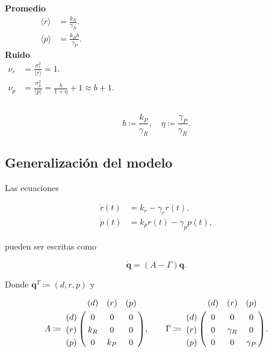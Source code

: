 \documentclass[xcolor=dvipsnames]{beamer}
\begin{document}
\begin{frame}

\begin{columns}[c]
\centering \textbf{Promedio}
\begin{align*}
\langle r \rangle &= \frac{k_R}{\gamma_R}.\\[1.5ex]
\langle p \rangle &= \frac{k_Rb}{\gamma_P}.
\end{align*}
\centering \textbf{Ruido}
\begin{align*}
\nu_r &= \frac{\sigma_r^2}{\langle r \rangle} = 1.\\[1.5ex]
\nu_p &= \frac{\sigma_p^2}{\langle p \rangle} = \frac{b}{1+\eta} + 1 \approx b + 1.
\end{align*}
\end{columns}

\vspace{3 mm}

\begin{equation*}
b \coloneqq \frac{k_P}{\gamma_R}, \quad \eta \coloneqq \frac{\gamma_P}{\gamma_R}.
\end{equation*}

\end{frame}

\subsection{Generalizaci\'on del modelo}
\begin{frame}

Las ecuaciones

\begin{align*}
\dot{r}(t) &= k_r - \gamma_rr(t),\\
\dot{p}(t) &= k_pr(t) - \gamma_pp(t),
\end{align*}

pueden ser escritas como

\begin{equation*}
\mathbf{\dot{q}} = (A - \Gamma)\mathbf{q}.
\end{equation*}

Donde $\mathbf{q}^T \coloneqq (d, r, p)$ y

\begin{align*}
A \coloneqq \bordermatrix{
  ~ & (d) & (r) & (p) \cr
  (d) & 0 & 0 & 0 \cr
  (r) & k_R & 0 & 0 \cr
  (p) & 0 & k_P & 0 \cr}, \quad \quad
\Gamma \coloneqq \bordermatrix{
  ~ & (d) & (r) & (p) \cr
  (d) & 0 & 0 & 0 \cr
  (r) & 0 & \gamma_R & 0 \cr
  (p) & 0 & 0 & \gamma_P \cr}.\\
\end{align*}
\end{frame}
\end{document}
